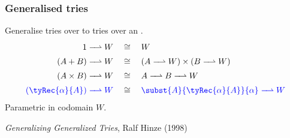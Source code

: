 \begin{frame}
\frametitle{Generalised tries}

Generalise tries over  to tries over an .
\begin{align*}
1 \toFin W
&\quad\cong\quad
W
\\
(A + B) \toFin W
&\quad\cong\quad
(A \toFin W) \times (B \toFin W)
\\
(A \times B) \toFin W
&\quad\cong\quad
A \toFin B \toFin W
\\
\textcolor{blue}{(\tyRec{\alpha}{A}) \toFin W}
&\quad\cong\quad
\textcolor{blue}{\subst{A}{\tyRec{\alpha}{A}}{\alpha} \toFin W}
\end{align*}
Parametric in codomain $W$.

\vspace{10pt}
\emph{Generalizing Generalized Tries}, Ralf Hinze (1998)
\end{frame}

